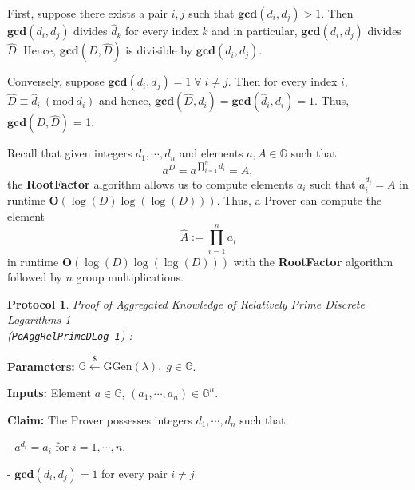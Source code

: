 \documentclass[11pt, lettersize, notitlepage, leqno, footskip=0.6cm]{article}
\newcommand{\pl}{\prod\limits}
\newcommand{\mb}{\mathbb}
\newcommand{\mbf}{\mathbf}
\newcommand{\mr}{\mathrm}
\newcommand{\lamb}{\lambda}
\newcommand{\what}{\widehat}
\newcommand{\vs}{\vspace{-0.15cm}}
\newcommand{\noin}{\noindent}
\newcommand{\Mod}[1]{\ (\mathrm{mod}\ #1)}
\newcommand{\GCD}{\mbf{gcd}}
\newtheorem{Prot}[Thm]{Protocol}
\numberwithin{equation}{section}
\begin{document}
\begin{prf} First, suppose there exists a pair $i,j$ such that $\GCD(d_i,d_j)> 1$. Then $\GCD(d_i,d_j)$ divides $\what{d}_k$ for every index $k$ and in particular, $\GCD(d_i,d_j)$ divides $\what{D}$. Hence, $\GCD(D,\what{D})$ is divisible by $\GCD(d_i,d_j)$.

Conversely, suppose $\GCD(d_i,d_j)=1\;\forall\;i\neq j$. Then for every index $i$, $\what{D}\equiv \what{d}_i\Mod{d_i} $ and hence, $\GCD(\what{D}, d_i) = \GCD(\what{d}_i, d_i) = 1$. Thus, $\GCD(D,\what{D})$ = 1.\end{prf}

\noin Recall that given integers $d_1,\cdots,d_n$ and elements $a,A\in\mb{G}$ such that \vs $$a^D = a^{\pl_{i=1}^n d_i} = A ,$$ the \textbf{RootFactor} algorithm allows us to compute elements $a_i$ such that $a_i^{d_i} = A$ in runtime $\mbf{O}(\log(D)\log(\log(D)))$. Thus, a Prover can compute the element \vs $$\what{A}:= \pl_{i=1}^n a_i$$ in runtime $\mbf{O}(\log(D)\log(\log(D)))$ with the \textbf{RootFactor} algorithm followed by $n$ group multiplications.

\vspace{0.2cm}

\begin{Prot} \normalfont \textit{Proof of Aggregated Knowledge of Relatively Prime Discrete Logarithms} 1 \\(\verb|PoAggRelPrimeDLog-1|) :\end{Prot} \vspace{-0.3cm}

\noindent \textbf{Parameters:} $\mb{G}\xleftarrow{\$} \mr{GGen}(\lamb), \; g\in \mb{G}$.

\noindent \textbf{Inputs:} Element $a\in\mb{G}$, $(a_1,\cdots,a_n)\in \mb{G}^n$.

\noindent \textbf{Claim:} The Prover possesses integers $d_1,\cdots, d_n$ such that:

\noindent - $a^{d_i} = a_i$ for $i = 1,\cdots, n$.

\noindent - $\GCD(d_i, d_j) = 1$ for every pair $i\neq j$.
\end{document}
